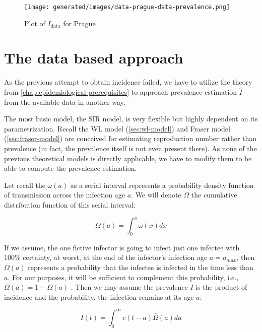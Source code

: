 \documentclass[
  digital, %
  oneside, %
  lof,     %
  lot,     %
]{fithesis4}
\begin{document}
\begin{figure}[H]
  \begin{center}
    \texttt{[image: generated/images/data-prague-data-prevalence.png]}
  \end{center}
  \caption{Plot of $I_{\text{data}}$ for Prague}
  \label{fig:data-prague-data-prevalence}
\end{figure}


\section{The data based approach}
\label{sec:data-based-approach}

As the previous attempt to obtain incidence failed, we have to utilize the theory from \autoref{chap:epidemiological-prerequisites} to approach prevalence estimation $\hat{I}$ from the available data in another way.

The most basic model, the SIR model, is very flexible but highly dependent on its parametrization.
Recall the WL model (\autoref{sec:wl-model}) and Fraser model (\autoref{sec:fraser-model}) are conceived for estimating reproduction number rather than prevalence (in fact, the prevalence itself is not even present there).
As none of the previous theoretical models is directly applicable, we have to modify them to be able to compute the prevalence estimation.

Let recall the $\omega(a)$ as a serial interval represents a probability density function of transmission across the infection age $a$.
We will denote $\Omega$ the cumulative distribution function of this serial interval:

\begin{equation}\label{eq:Omega-int}
  \Omega(a) = \int_{0}^a \omega(x) dx
\end{equation}

If we assume, the one fictive infector is going to infect just one infectee with $100\%$ certainty, at worst, at the end of the infector's infection age $a = a_{max}$, then $\Omega(a)$ represents a probability that the infectee is infected in the time less than $a$.
For our purposes, it will be sufficient to complement this probability, i.e., $\bar{\Omega}(a) = 1 - \Omega(a)$ . Then we may assume the prevalence $I$ is the product of incidence and the probability, the infection remains at its age $a$:

\begin{equation}\label{eq:prevalence-int}
  I(t) = \int_0^{\infty} c(t - a) \bar{\Omega}(a) da
\end{equation}
\end{document}
